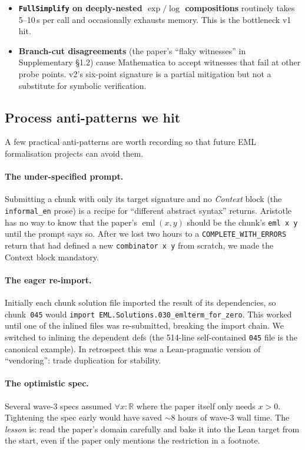 \documentclass[11pt,a4paper]{article}
\theoremstyle{plain}
\theoremstyle{definition}
\newcommand{\eml}{\operatorname{eml}}
\newcommand{\R}{\mathbb{R}}
\begin{document}
\begin{itemize}[leftmargin=*]
\item \textbf{\texttt{FullSimplify} on deeply-nested $\exp/\log$
compositions} routinely takes 5--10\,s per call and occasionally
exhausts memory.  This is the bottleneck v1 hit.
\item \textbf{Branch-cut disagreements} (the paper's ``flaky witnesses''
in Supplementary §1.2) cause Mathematica to accept witnesses that fail at
other probe points.  v2's six-point signature is a partial mitigation
but not a substitute for symbolic verification.
\end{itemize}

\subsection{Process anti-patterns we hit}

A few practical anti-patterns are worth recording so that future EML
formalisation projects can avoid them.

\paragraph{The under-specified prompt.}  Submitting a chunk with only
its target signature and no \emph{Context} block (the
\texttt{informal\_en} prose) is a recipe for ``different abstract
syntax'' returns.  Aristotle has no way to know that the paper's
$\eml(x,y)$ should be the chunk's \texttt{eml x y} until the prompt
says so.  After we lost two hours to a \texttt{COMPLETE\_WITH\_ERRORS}
return that had defined a new \texttt{combinator x y} from scratch, we
made the Context block mandatory.

\paragraph{The eager re-import.}  Initially each chunk solution
file imported the result of its dependencies, so chunk~\texttt{045}
would \texttt{import EML.Solutions.030\_emlterm\_for\_zero}.  This
worked until one of the inlined files was re-submitted, breaking the
import chain.  We switched to inlining the dependent
defs (the 514-line self-contained \texttt{045} file is the canonical
example).  In retrospect this was a Lean-pragmatic version of
``vendoring'': trade duplication for stability.

\paragraph{The optimistic spec.}  Several wave-3 specs assumed
$\forall x : \R$ where the paper itself only needs $x > 0$.  Tightening
the spec early would have saved $\sim$8 hours of wave-3 wall time.
The \emph{lesson} is: read the paper's domain carefully and bake it
into the Lean target from the start, even if the paper only mentions
the restriction in a footnote.
\end{document}
